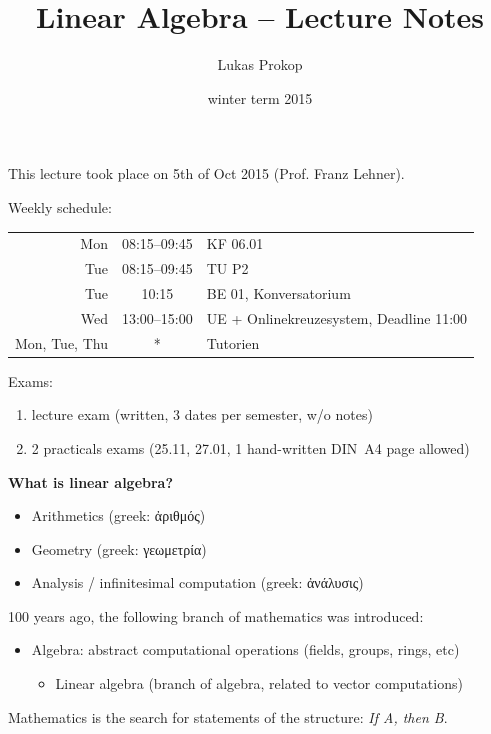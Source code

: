 \documentclass[a4paper,landscape,twocolumn]{article}
\title{Linear Algebra -- Lecture Notes}
\author{Lukas Prokop}
\date{winter term 2015}
\newcommand\meta[3]{This #1 took place on #2 (#3).\par}
\newcommand{\textgreek}[1]{\begingroup\fontencoding{LGR}\selectfont#1\endgroup}
\begin{document}
\maketitle
\tableofcontents

\clearpage
\meta{lecture}{5th of Oct 2015}{Prof. Franz Lehner}

Weekly schedule:

\begin{table}[!ht]
  \begin{tabular}{rcl}
    \hline \hline
    Mon & 08:15--09:45 & KF 06.01 \\
    Tue & 08:15--09:45 & TU P2 \\
    Tue & 10:15 & BE 01, Konversatorium \\
    Wed & 13:00--15:00 & UE + Onlinekreuzesystem, Deadline 11:00 \\
    Mon, Tue, Thu & * & Tutorien \\
    \hline \hline
  \end{tabular}
\end{table}

Exams:
\begin{enumerate}
  \item lecture exam (written, 3 dates per semester, w/o notes)
  \item 2 practicals exams (25.11, 27.01, 1 hand-written DIN~A4 page allowed)
\end{enumerate}

\textbf{What is linear algebra?}
\begin{itemize}
  \item Arithmetics (greek: \textgreek{ἀριθμός})
  \item Geometry (greek: \textgreek{γεωμετρία})
  \item Analysis / infinitesimal computation (greek: \textgreek{ἀνάλυσις})
\end{itemize}

100 years ago, the following branch of mathematics was introduced:
\begin{itemize}
  \item Algebra: abstract computational operations (fields, groups, rings, etc)
  \begin{itemize}
    \item Linear algebra (branch of algebra, related to vector computations)
  \end{itemize}
\end{itemize}

Mathematics is the search for statements of the structure: \emph{If A, then B}.
\end{document}
